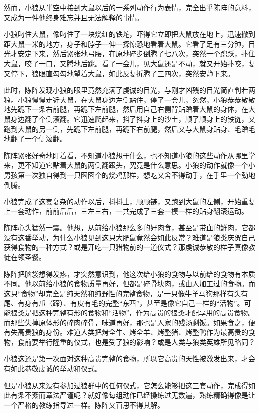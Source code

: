 \par 然而，小狼从半空中接到大鼠以后的一系列动作行为表情，完全出乎陈阵的意料，又成为一件他终身难忘并且无法解释的事情。
\par 小狼叼住大鼠，像叼住了一块烧红的铁坨，吓得它立即把大鼠放在地上，迅速撤到距大鼠一米的地方，身子和脖子一伸一探惊恐地看着大鼠。它看了足有三分钟，目光才安定下来，然后紧张地弓腰，在原地碎步倒腾了七八次，突然一个蹿跃，扑住大鼠，咬了一口，又腾地后跳。看了一会儿，见大鼠还是不动，就又开始扑咬，复又停下，狼眼直勾勾地望着大鼠，如此反复折腾了三四次，突然安静下来。
\par 此时，陈阵发现小狼的眼里竟然充满了虔诚的目光，与刚才凶残的目光简直判若两狼。小狼慢慢走近大鼠，在大鼠身边左侧站住，停了一会儿，忽然，小狼恭恭敬敬地先跪下一条右前腿，再跪下左前腿，然后用自己右侧背贴蹭着大鼠的身体，在大鼠身边翻了个侧滚翻。它迅速爬起来，抖了抖身上的沙土，顺了顺身上的铁链，又跑到大鼠的另一侧，先跪下左前腿，再跪下右前腿，然后又与大鼠身贴身、毛蹭毛地翻了一个侧滚翻。
\par 陈阵紧张好奇地盯着看，不知道小狼想干什么，也不知道小狼的这些动作从哪里学来，更不知道它贴着大鼠的两侧翻跟头，究竟是什么意思。小狼的动作就像一个小男孩第一次独自得到一只囫囵个的烧鸡那样，想吃又舍不得动手，在手里一个劲地倒腾。
\par 小狼完成了这套复杂的动作以后，抖抖土，顺顺链，又跑到大鼠的左侧，开始重复上一套动作，前前后后，三左三右，一共完成了三套一模一样的贴身翻滚运动。
\par 陈阵心头猛然一震。他想，从前给小狼那么多的好肉食，甚至是带血的鲜肉，它都没有这番举动，为什么小狼见到这只大肥鼠竟然会如此反常？难道是狼类庆贺自己获得食物的一种方式？或是开吃一只猎物前的一道仪式？那虔诚恭敬的样子真像教徒在领圣餐。
\par 陈阵把脑袋想得发疼，才突然意识到，他这次给小狼的食物与以前给的食物有本质不同。他以前给小狼的食物质量再好，但都是碎骨块肉，或由人加工过的食物。而这只“食物”却完全是纯天然和纯野性的完整食物，是一只像牛羊马狗那样有头有尾、有身有爪（蹄）、有皮有毛的完整“东西”，甚至是像它自己一样的“活物”。可能狼类是把这种完整有形的食物和“活物”，作为高贵的狼类才配享用的高贵食物。而那些失掉原体形的碎肉碎骨，味道再好，那也是人家的残汤剩饭。如果食之，便有失高贵狼的身份。难道人类把烤全牛、烤全羊、烤整猪、烤整鸭作为最高贵的食物，食前要举行隆重的仪式，也是受了狼的影响？或是人类与狼类英雄所见略同？
\par 小狼这还是第一次面对这种高贵完整的食物，所以它高贵的天性被激发出来，才会有如此恭敬虔诚的举动和仪式。
\par 但是小狼从来没有参加过狼群中的任何仪式，它怎么能够把这三套动作，完成得如此有条不紊而章法严谨呢？就好像每组动作已经操练过无数遍，熟练精确得像是让一个严格的教练指导过一样。陈阵又百思不得其解。
